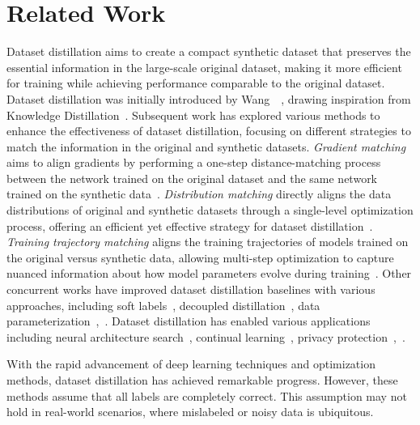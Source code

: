 \section{Related Work}

Dataset distillation aims to create a compact synthetic dataset that preserves the essential information in the large-scale original dataset, making it more efficient for training while achieving performance comparable to the original dataset.
Dataset distillation was initially introduced by Wang~\etal ~\cite{wang2018dataset}, drawing inspiration from Knowledge Distillation~\cite{hinton2015distilling}.
Subsequent work has explored various methods to enhance the effectiveness of dataset distillation, focusing on different strategies to match the information in the original and synthetic datasets. 
\textit{Gradient matching} aims to align gradients by performing a one-step distance-matching process between the network trained on the original dataset and the same network trained on the synthetic data~\cite{zhao2021datasetcondensation, lee2022dataset, zhao2021dataset}.
\textit{Distribution matching} directly aligns the data distributions of original and synthetic datasets through a single-level optimization process, offering an efficient yet effective strategy for dataset distillation~\cite{sajedi2023datadam, liu2023wasserstein, zhao2023improved, deng2024exploiting}.
\textit{Training trajectory matching} aligns the training trajectories of models trained on the original versus synthetic data, allowing multi-step optimization to capture nuanced information about how model parameters evolve during training~\cite{cazenavette2022distillation, yang2024nsd, du2023minimizing, guo2024lossless, liu2024dataset}. 
Other concurrent works have improved dataset distillation baselines with various approaches, including soft labels~\cite{xiao2024soft, sucholutsky2021soft, qin2024label}, decoupled distillation~\cite{yin2023sre2l, shao2024gvbsm, sun2024rded}, data parameterization~\cite{wei2023sparse, son2024fyi, kim2022dataset},~\etc.
Dataset distillation has enabled various applications including neural architecture search~\cite{medvedev2021tabular, cui2022dc, zhao2021dataset}, continual learning~\cite{sangermano2022sample, yang2023efficient, gu2024ssd}, privacy protection~\cite{chung2024backdoor, li2023sharing, li2024infodist},~\etc. 


With the rapid advancement of deep learning techniques and optimization methods, dataset distillation has achieved remarkable progress.
However, these methods assume that all labels are completely correct.
This assumption may not hold in real-world scenarios, where mislabeled or noisy data is ubiquitous. 


